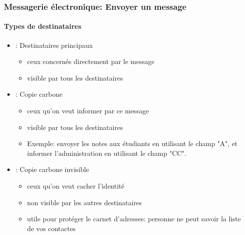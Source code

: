 \documentclass[xcolor=table]{beamer}
\begin{document}
\begin{frame}
\frametitle{Messagerie électronique: Envoyer un message}
\framesubtitle{Types de destinataires}

\begin{itemize}
	\item {}: Destinataires principaux
	\begin{itemize}
		\item ceux concernés directement par le message 
		\item visible par tous les destinataires
	\end{itemize}

	\item {}: Copie carbone
	\begin{itemize}
		\item ceux qu'on veut informer par ce message 
		\item visible par tous les destinataires
		\item Exemple: envoyer les notes aux étudiants en utilisant le champ "A", et informer l'administration en utilisant le champ "CC".
	\end{itemize}

	\item {}: Copie carbone invisible
	\begin{itemize}
		\item ceux qu'on veut cacher l'identité 
		\item non visible par les autres destinataires
		\item utile pour protéger le carnet d'adresses: personne ne peut savoir la liste de vos contactes
	\end{itemize}

\end{itemize}


\end{frame}
\end{document}
